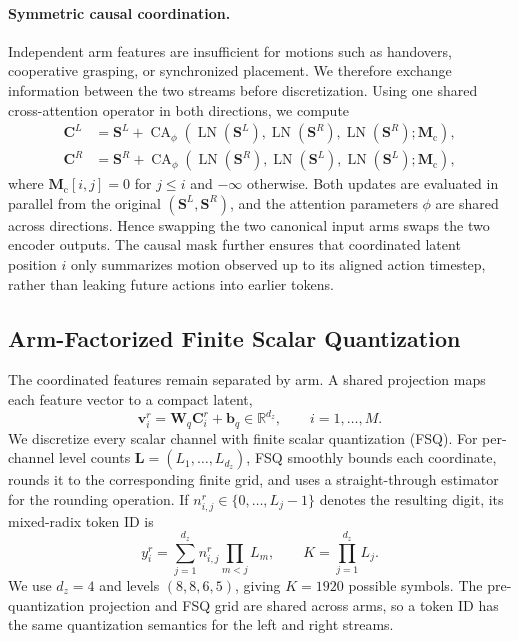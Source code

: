 \paragraph{Symmetric causal coordination.}
Independent arm features are insufficient for motions such as handovers,
cooperative grasping, or synchronized placement.  We therefore exchange
information between the two streams before discretization.  Using one shared
cross-attention operator in both directions, we compute
\begin{align}
    \mathbf{C}^{L}
    &= \mathbf{S}^{L}
       + \operatorname{CA}_{\phi}
       \!\left(\operatorname{LN}(\mathbf{S}^{L}),
               \operatorname{LN}(\mathbf{S}^{R}),
               \operatorname{LN}(\mathbf{S}^{R});\mathbf{M}_{\mathrm{c}}\right),
       \nonumber\\
    \mathbf{C}^{R}
    &= \mathbf{S}^{R}
       + \operatorname{CA}_{\phi}
       \!\left(\operatorname{LN}(\mathbf{S}^{R}),
               \operatorname{LN}(\mathbf{S}^{L}),
               \operatorname{LN}(\mathbf{S}^{L});\mathbf{M}_{\mathrm{c}}\right),
    \label{eq:btt_cross_attention}
\end{align}
where $\mathbf{M}_{\mathrm{c}}[i,j]=0$ for $j\leq i$ and $-\infty$
otherwise.  Both updates are evaluated in parallel from the original
$(\mathbf{S}^{L},\mathbf{S}^{R})$, and the attention parameters $\phi$ are
shared across directions.  Hence swapping the two canonical input arms swaps
the two encoder outputs.  The causal mask further ensures that coordinated
latent position $i$ only summarizes motion observed up to its aligned action
timestep, rather than leaking future actions into earlier tokens.

\subsection{Arm-Factorized Finite Scalar Quantization}
\label{sec:btt_quantization}

The coordinated features remain separated by arm.  A shared projection maps
each feature vector to a compact latent,
\begin{equation}
    \mathbf{v}^{r}_{i}
    = \mathbf{W}_{q}\mathbf{C}^{r}_{i}+\mathbf{b}_{q}
    \in\mathbb{R}^{d_z},
    \qquad i=1,\ldots,M.
    \label{eq:btt_prequant}
\end{equation}
We discretize every scalar channel with finite scalar quantization (FSQ).  For
per-channel level counts $\mathbf{L}=(L_1,\ldots,L_{d_z})$, FSQ smoothly bounds
each coordinate, rounds it to the corresponding finite grid, and uses a
straight-through estimator for the rounding operation.  If
$n^{r}_{i,j}\in\{0,\ldots,L_j-1\}$ denotes the resulting digit, its mixed-radix
token ID is
\begin{equation}
    y^{r}_{i}
    = \sum_{j=1}^{d_z} n^{r}_{i,j}
      \prod_{m<j}L_m,
    \qquad
    K=\prod_{j=1}^{d_z}L_j.
    \label{eq:btt_fsq}
\end{equation}
We use $d_z=4$ and levels $(8,8,6,5)$, giving $K=1920$ possible symbols.  The
pre-quantization projection and FSQ grid are shared across arms, so a token ID
has the same quantization semantics for the left and right streams.

